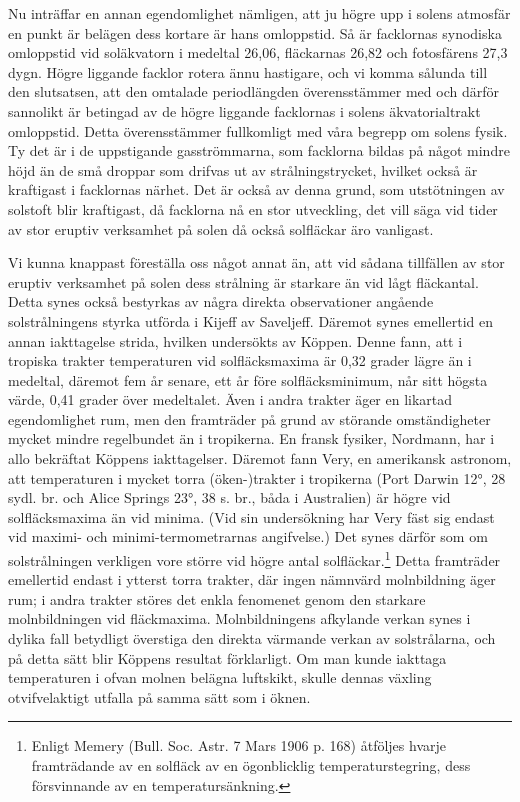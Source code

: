 \documentclass[a4paper, 12pt, oneside, swedish]{article}
\begin{document}
Nu inträffar en annan egendomlighet nämligen, att ju högre upp i solens atmosfär en punkt är belägen dess kortare är hans omloppstid. Så är facklornas synodiska omloppstid vid soläkvatorn i medeltal 26,06, fläckarnas 26,82 och fotosfärens 27,3 dygn. Högre liggande facklor rotera ännu hastigare, och vi komma sålunda till den slutsatsen, att den omtalade periodlängden överensstämmer med och därför sannolikt är betingad av de högre liggande facklornas i solens äkvatorialtrakt omloppstid. Detta överensstämmer fullkomligt med våra begrepp om solens fysik. Ty det är i de uppstigande gasströmmarna, som facklorna bildas på något mindre höjd än de små droppar som drifvas ut av strålningstrycket, hvilket också är kraftigast i facklornas närhet. Det är också av denna grund, som utstötningen av solstoft blir kraftigast, då facklorna nå en stor utveckling, det vill säga vid tider av stor eruptiv verksamhet på solen då också solfläckar äro vanligast.

Vi kunna knappast föreställa oss något annat än, att vid sådana tillfällen av stor eruptiv verksamhet på solen dess strålning är starkare än vid lågt fläckantal. Detta synes också bestyrkas av några direkta observationer angående solstrålningens styrka utförda i Kijeff av Saveljeff. Däremot synes emellertid en annan iakttagelse strida, hvilken undersökts av Köppen. Denne fann, att i tropiska trakter temperaturen vid solfläcksmaxima är 0,32 grader lägre än i medeltal, däremot fem år senare, ett år före solfläcksminimum, når sitt högsta värde, 0,41 grader över medeltalet. Även i andra trakter äger en likartad egendomlighet rum, men den framträder på grund av störande omständigheter mycket mindre regelbundet än i tropikerna. En fransk fysiker, Nordmann, har i allo bekräftat Köppens iakttagelser. Däremot fann Very, en amerikansk astronom, att temperaturen i mycket torra (öken-)trakter i tropikerna (Port Darwin 12°, 28 sydl. br. och Alice Springs 23°, 38 s. br., båda i Australien) är högre vid solfläcksmaxima än vid minima. (Vid sin undersökning har Very fäst sig endast vid maximi- och minimi-termometrarnas angifvelse.) Det synes därför som om solstrålningen verkligen vore större vid högre antal solfläckar.\footnote{Enligt Memery (Bull. Soc. Astr. 7 Mars 1906 p. 168) åtföljes hvarje framträdande av en solfläck av en ögonblicklig temperaturstegring, dess försvinnande av en temperatursänkning.} Detta framträder emellertid endast i ytterst torra trakter, där ingen nämnvärd molnbildning äger rum; i andra trakter störes det enkla fenomenet genom den starkare molnbildningen vid fläckmaxima. Molnbildningens afkylande verkan synes i dylika fall betydligt överstiga den direkta värmande verkan av solstrålarna, och på detta sätt blir Köppens resultat förklarligt. Om man kunde iakttaga temperaturen i ofvan molnen belägna luftskikt, skulle dennas växling otvifvelaktigt utfalla på samma sätt som i öknen.
\end{document}
